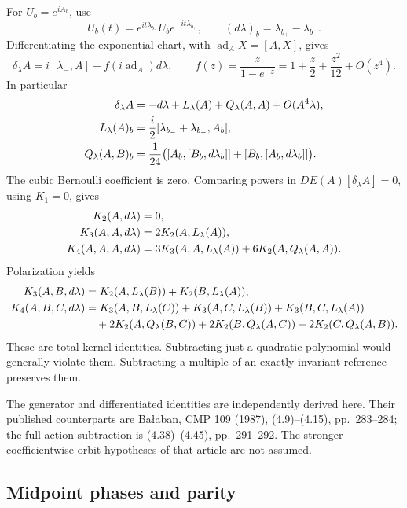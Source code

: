 For \(U_b=e^{iA_b}\), use
\[
 U_b(t)=e^{it\lambda_{b_-}}U_be^{-it\lambda_{b_+}},
 \qquad (d\lambda)_b=\lambda_{b_+}-\lambda_{b_-}.
\]
Differentiating the exponential chart, with
\(\operatorname{ad}_A X=[A,X]\), gives
\begin{equation}
 \delta_\lambda A
 =i[\lambda_-,A]-f(i\operatorname{ad}_A)d\lambda,
 \qquad
 f(z)=\frac{z}{1-e^{-z}}
       =1+\frac z2+\frac{z^2}{12}+O(z^4).
 \label{tkw-generator}
\end{equation}
In particular
\begin{align}
 \delta_\lambda A
   &=-d\lambda+L_\lambda(A)+Q_\lambda(A,A)
                        +O(A^4\lambda),\notag\\
 L_\lambda(A)_b
   &=\frac i2[\lambda_{b_-}+\lambda_{b_+},A_b],\notag\\
 Q_\lambda(A,B)_b
   &=\frac1{24}\bigl(
      [A_b,[B_b,d\lambda_b]]+
      [B_b,[A_b,d\lambda_b]]\bigr).
 \label{tkw-LQ}
\end{align}
The cubic Bernoulli coefficient is zero. Comparing powers in
\(DE(A)[\delta_\lambda A]=0\), using \(K_1=0\), gives
\begin{align}
 K_2(A,d\lambda)&=0,\notag\\
 K_3(A,A,d\lambda)&=2K_2(A,L_\lambda(A)),\notag\\
 K_4(A,A,A,d\lambda)
   &=3K_3(A,A,L_\lambda(A))
       +6K_2(A,Q_\lambda(A,A)).
 \label{tkw-Ward-diagonal}
\end{align}
Polarization yields
\begin{align}
 K_3(A,B,d\lambda)
   &=K_2(A,L_\lambda(B))+K_2(B,L_\lambda(A)),\label{tkw-Ward-cubic}\\
 K_4(A,B,C,d\lambda)
   &=K_3(A,B,L_\lambda(C))
      +K_3(A,C,L_\lambda(B))
      +K_3(B,C,L_\lambda(A))\notag\\
   &\quad+2K_2(A,Q_\lambda(B,C))
      +2K_2(B,Q_\lambda(A,C))
      +2K_2(C,Q_\lambda(A,B)).
 \label{tkw-Ward-quartic}
\end{align}
These are total-kernel identities. Subtracting just a quadratic
polynomial would generally violate them. Subtracting a multiple
of an exactly invariant reference preserves them.

The generator and differentiated identities are independently
derived here. Their published counterparts are Ba{\l}aban,
CMP 109 (1987), (4.9)--(4.15), pp.~283--284; the full-action
subtraction is (4.38)--(4.45), pp.~291--292. The stronger
coefficientwise orbit hypotheses of that article are not assumed.

\subsection{Midpoint phases and parity}
\label{tkw-midpoint-section}

